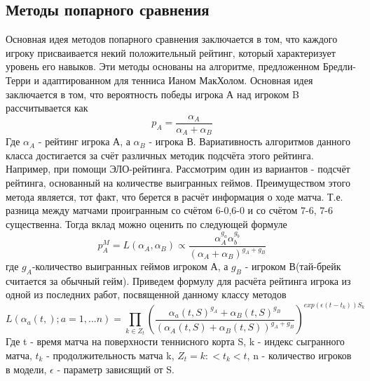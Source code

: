 \subsection{Методы попарного сравнения}
Основная идея методов попарного сравнения заключается в том, что каждого игроку присваивается некий положительный рейтинг, который характеризует уровень его навыков. Эти методы основаны на алгоритме, предложенном Бредли-Терри\cite{Book17} и адаптированном для тенниса Ианом МакХолом\cite{Book18}.
Основная идея заключается в том, что вероятность победы игрока А над игроком B рассчитывается как
\begin{equation}
p_A=\frac{\alpha_A}{\alpha_A + \alpha_B}\label{eq2}
\end{equation}
Где $\alpha_A$ - рейтинг игрока А, а $\alpha_B$ - игрока В. Вариативность алгоритмов данного класса достигается за счёт различных методик подсчёта этого рейтинга. Например, при помощи ЭЛО-рейтинга\cite{Book24}. Рассмотрим один из вариантов - подсчёт рейтинга, основанный на количестве выигранных геймов. Преимуществом этого метода является, тот факт, что берется в расчёт информация о ходе матча. Т.е. разница между матчами проигранным со счётом 6-0,6-0 и со счётом 7-6, 7-6 существенна.
Тогда вклад можно оценить по следующей формуле
\begin{equation}
p^M_A=L(\alpha_A,\alpha_B) ∝\frac{\alpha_A^{g_a}\alpha_b^{g_b}}{(\alpha_A + \alpha_B)^{g_A + g_B}}
\end{equation} 
где $g_A$-количество выигранных геймов игроком А, а $g_B$ -  игроком В(тай-брейк  считается за обычный гейм).
Приведем формулу для расчёта рейтинга игрока из одной из последних работ, посвященной данному классу методов
\begin{equation}
L(\alpha_a(t,); a=1,...n) = \prod_{k\in Z_t}(\frac{\alpha_a(t,S)^{g_A} + \alpha_B(t,S)^{g_B}}{(\alpha_A(t,S) + \alpha_B(t,S))^{g_A + g_B}})^{exp(\epsilon( t-t_k))S_k}
\end{equation}
Где t - время матча на поверхности теннисного корта S, k - индекс сыгранного матча, $t_k$ - продолжительность матча k, $Z_t={k : < t_k < t}$, n - количество игроков в модели, $\epsilon$ - параметр зависящий от S.

